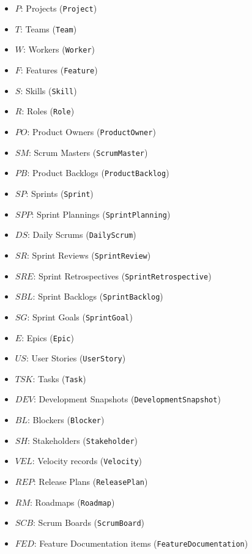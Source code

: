 \documentclass[11pt]{article}
\begin{document}
\begin{itemize}
  \item $P$: Projects (\texttt{Project})
  \item $T$: Teams (\texttt{Team})
  \item $W$: Workers (\texttt{Worker})
  \item $F$: Features (\texttt{Feature})
  \item $S$: Skills (\texttt{Skill})
  \item $R$: Roles (\texttt{Role})
  \item $PO$: Product Owners (\texttt{ProductOwner})
  \item $SM$: Scrum Masters (\texttt{ScrumMaster})
  \item $PB$: Product Backlogs (\texttt{ProductBacklog})
  \item $SP$: Sprints (\texttt{Sprint})
  \item $SPP$: Sprint Plannings (\texttt{SprintPlanning})
  \item $DS$: Daily Scrums (\texttt{DailyScrum})
  \item $SR$: Sprint Reviews (\texttt{SprintReview})
  \item $SRE$: Sprint Retrospectives (\texttt{SprintRetrospective})
  \item $SBL$: Sprint Backlogs (\texttt{SprintBacklog})
  \item $SG$: Sprint Goals (\texttt{SprintGoal})
  \item $E$: Epics (\texttt{Epic})
  \item $US$: User Stories (\texttt{UserStory})
  \item $TSK$: Tasks (\texttt{Task})
  \item $DEV$: Development Snapshots (\texttt{DevelopmentSnapshot})
  \item $BL$: Blockers (\texttt{Blocker})
  \item $SH$: Stakeholders (\texttt{Stakeholder})
  \item $VEL$: Velocity records (\texttt{Velocity})
  \item $REP$: Release Plans (\texttt{ReleasePlan})
  \item $RM$: Roadmaps (\texttt{Roadmap})
  \item $SCB$: Scrum Boards (\texttt{ScrumBoard})
  \item $FED$: Feature Documentation items (\texttt{FeatureDocumentation})
\end{itemize}
\end{document}
